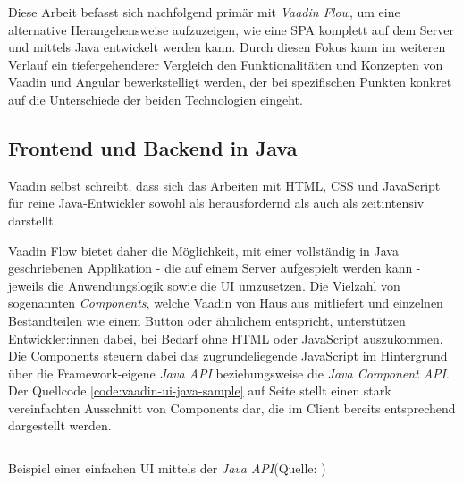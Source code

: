 \documentclass[a4paper,12pt,twoside]{scrreprt}
\begin{document}
Diese Arbeit befasst sich nachfolgend primär mit \textit{Vaadin Flow}, um eine alternative Herangehensweise aufzuzeigen, wie eine \acl{SPA} komplett auf dem Server und mittels Java entwickelt werden kann. Durch diesen Fokus kann im weiteren Verlauf ein tiefergehenderer Vergleich den Funktionalitäten und Konzepten von Vaadin und Angular bewerkstelligt werden, der bei spezifischen Punkten konkret auf die Unterschiede der beiden Technologien eingeht.

\subsection{Frontend und Backend in Java}
\label{sub-sec:frontend-backend-java}
Vaadin selbst schreibt, dass sich das Arbeiten mit HTML, CSS und JavaScript für reine Java-Entwickler sowohl als herausfordernd als auch als zeitintensiv darstellt. \parencite[][Framework - Introduction]{vaadin_ltd_documentation_2021}

Vaadin Flow bietet daher die Möglichkeit, mit einer vollständig in Java geschriebenen Applikation - die auf einem Server aufgespielt werden kann - jeweils die Anwendungslogik sowie die \acs{UI} umzusetzen. Die Vielzahl von sogenannten \textit{Components}, welche Vaadin von Haus aus mitliefert und einzelnen Bestandteilen wie einem Button oder ähnlichem entspricht, unterstützen Entwickler:innen dabei, bei Bedarf ohne HTML oder JavaScript auszukommen. Die Components steuern dabei das zugrundeliegende JavaScript im Hintergrund über die Framework-eigene \textit{Java API} beziehungsweise die \textit{Java Component API}. Der Quellcode \ref{code:vaadin-ui-java-sample} auf Seite \pageref{code:vaadin-ui-java-sample} stellt einen stark vereinfachten Ausschnitt von Components dar, die im Client bereits entsprechend dargestellt werden. \parencite[][Framework - Introduction]{vaadin_ltd_documentation_2021}

\begin{listing}[ht]
    \inputminted[fontsize=\footnotesize,linenos]{java}{code/Sample_Java_ui_Vaadin.java}
    \caption[Beispiel einer einfachen \acs{UI} mittels der \textit{Java API}]{Beispiel einer einfachen \acs{UI} mittels der \textit{Java API}\newline(Quelle: \cite[][Framework - Introduction]{vaadin_ltd_documentation_2021})}
    \label{code:vaadin-ui-java-sample}
\end{listing}


\clearpage
{}
{}
\printbibliography
\end{document}
